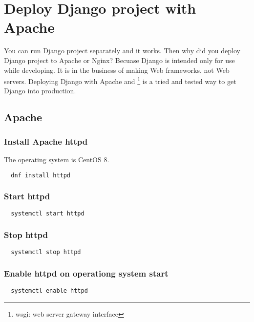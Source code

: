 
\chapter{Deploy Django project with Apache}

You can run Django project separately and it works.
Then why did you deploy Django project to Apache or Nginx?
Becuase Django is intended only for use while developing.
It is in the business of making Web frameworks, not Web servers.
Deploying Django with Apache and \footnote{wsgi: web server gateway interface} is a tried and tested way to get Django into production.



\section{Apache}

\subsection{Install Apache httpd}

The operating system is CentOS 8.
\lstset{language=Sh}
\begin{lstlisting}
  dnf install httpd
\end{lstlisting}

\subsection{Start httpd}

\begin{lstlisting}
  systemctl start httpd
\end{lstlisting}

\subsection{Stop httpd}

\begin{lstlisting}
  systemctl stop httpd
\end{lstlisting}

\subsection{Enable httpd on operationg system start}

\begin{lstlisting}
  systemctl enable httpd
\end{lstlisting}



